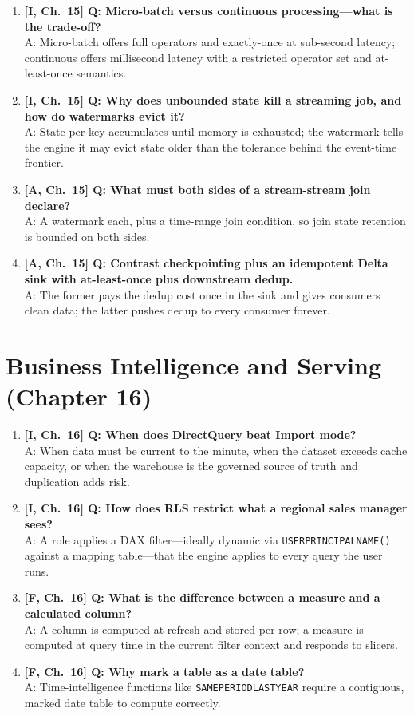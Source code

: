 \begin{enumerate}
    \item \textbf{[I, Ch.~15] Q: Micro-batch versus continuous processing---what is the trade-off?}\\
    A: Micro-batch offers full operators and exactly-once at sub-second latency; continuous offers millisecond latency with a restricted operator set and at-least-once semantics.
    \item \textbf{[I, Ch.~15] Q: Why does unbounded state kill a streaming job, and how do watermarks evict it?}\\
    A: State per key accumulates until memory is exhausted; the watermark tells the engine it may evict state older than the tolerance behind the event-time frontier.
    \item \textbf{[A, Ch.~15] Q: What must both sides of a stream-stream join declare?}\\
    A: A watermark each, plus a time-range join condition, so join state retention is bounded on both sides.
    \item \textbf{[A, Ch.~15] Q: Contrast checkpointing plus an idempotent Delta sink with at-least-once plus downstream dedup.}\\
    A: The former pays the dedup cost once in the sink and gives consumers clean data; the latter pushes dedup to every consumer forever.
\end{enumerate}

\section{Business Intelligence and Serving (Chapter 16)}

\begin{enumerate}
    \item \textbf{[I, Ch.~16] Q: When does DirectQuery beat Import mode?}\\
    A: When data must be current to the minute, when the dataset exceeds cache capacity, or when the warehouse is the governed source of truth and duplication adds risk.
    \item \textbf{[I, Ch.~16] Q: How does RLS restrict what a regional sales manager sees?}\\
    A: A role applies a DAX filter---ideally dynamic via \texttt{USERPRINCIPALNAME()} against a mapping table---that the engine applies to every query the user runs.
    \item \textbf{[F, Ch.~16] Q: What is the difference between a measure and a calculated column?}\\
    A: A column is computed at refresh and stored per row; a measure is computed at query time in the current filter context and responds to slicers.
    \item \textbf{[F, Ch.~16] Q: Why mark a table as a date table?}\\
    A: Time-intelligence functions like \texttt{SAMEPERIODLASTYEAR} require a contiguous, marked date table to compute correctly.
\end{enumerate}

